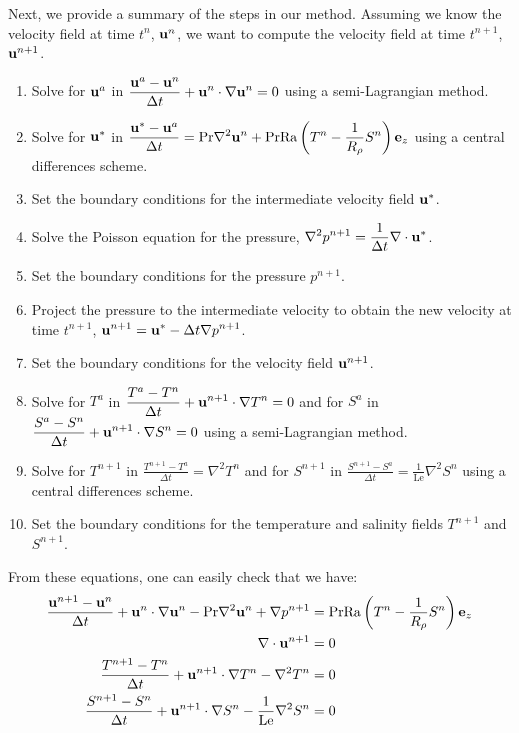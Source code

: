 \documentclass{article}
\def\Ra{\mathrm{Ra}}
\def\Pr{\mathrm{Pr}}
\def\Le{\mathrm{Le}}
\begin{document}
Next, we provide a summary of the steps in our method. Assuming we know the velocity field at time $t^n$, $\boldsymbol{\mathrm{u}}^n$, we want to compute the velocity field at time $t^{n+1}$, $\boldsymbol{\mathrm{u}}^{n+1}$.
\begin{enumerate}
  \item Solve for $\boldsymbol{\mathrm{u}}^a$ in $\displaystyle  \frac{\boldsymbol{\mathrm{u}}^a-\boldsymbol{\mathrm{u}}^n}{\Delta t} + \boldsymbol{\mathrm{u}}^n \cdot \nabla \boldsymbol{\mathrm{u}}^n = 0$ using a semi-Lagrangian method.
  \item Solve for $\boldsymbol{\mathrm{u}}^*$ in $\displaystyle  \frac{\vf{u}^* - \vf{u}^a}{\Delta t} = \Pr \nabla^2 \vf{u}^n +\Pr\Ra\left(T^n - \frac{1}{R_{\rho}}S^n\right)\vf{e}_z$ using a central differences scheme.
  \item Set the boundary conditions for the intermediate velocity field $\boldsymbol{\mathrm{u}}^*$.
  \item Solve the Poisson equation for the pressure, $\displaystyle \nabla^2 p^{n+1} = \frac{1}{\Delta t}\nabla \cdot \boldsymbol{\mathrm{u}}^*$.
  \item Set the boundary conditions for the pressure $p^{n+1}$.
  \item Project the pressure to the intermediate velocity to obtain the new velocity at time $t^{n+1}$, $\displaystyle \boldsymbol{\mathrm{u}}^{n+1} = \boldsymbol{\mathrm{u}}^* - \Delta t\nabla p^{n+1}$.
  \item Set the boundary conditions for the velocity field $\boldsymbol{\mathrm{u}}^{n+1}$.
  \item Solve for $T^{a}$ in $\displaystyle  \frac{T^{a}-T^{n}}{\Delta t} + \boldsymbol{\mathrm{u}}^{n+1} \cdot \nabla T^{n} = 0$ and for $S^{a}$ in $\displaystyle  \frac{S^{a}-S^{n}}{\Delta t} + \boldsymbol{\mathrm{u}}^{n+1} \cdot \nabla S^{n} = 0$ using a semi-Lagrangian method.
  \item Solve for $T^{n+1}$ in $\displaystyle  \frac{T^{n+1}-T^{a}}{\Delta t} = \nabla^2 T^{n}$ and for $S^{n+1}$ in $\displaystyle  \frac{S^{n+1}-S^{a}}{\Delta t} = \frac{1}{\Le}\nabla^2 S^{n}$ using a central differences scheme.
  \item Set the boundary conditions for the temperature and salinity fields $T^{n+1}$ and $S^{n+1}$.
\end{enumerate}
From these equations, one can easily check that we have:
\begin{align*}
  \frac{\vf{u}^{n+1}-\vf{u}^n}{\Delta t} + \vf{u}^n \cdot \nabla \vf{u}^n - \Pr \nabla^2 \vf{u}^n + \nabla p^{n+1} & = \Pr\Ra\left(T^n - \frac{1}{R_{\rho}}S^n\right)\vf{e}_z \\
  \nabla \cdot \vf{u}^{n+1}                                                                                        & = 0                                                      \\
  \frac{T^{n+1}-T^{n}}{\Delta t} + \vf{u}^{n+1} \cdot \nabla T^{n} - \nabla^2 T^{n}                                & = 0                                                      \\
  \frac{S^{n+1}-S^{n}}{\Delta t} + \vf{u}^{n+1} \cdot \nabla S^{n} - \frac{1}{\Le}\nabla^2 S^{n}                   & = 0
\end{align*}
\end{document}
